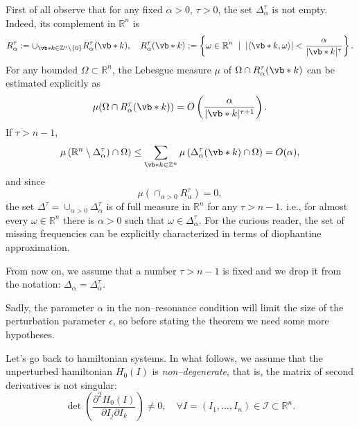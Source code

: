 \documentclass[english,fontsize=11pt,paper=b5]{scrbook}
\numberwithin{equation}{chapter}
\theoremstyle{definition}
\begin{document}
      First of all observe that for any fixed $\alpha>0$, $\tau>0$, the set $\Delta_\alpha^\tau$ is not empty. Indeed, its complement in $\mathbb{R}^n$ is
      \begin{equation}
        R_{\alpha}^\tau := \cup_{\vb* k \in \mathbb{Z}^n\setminus\{0\}} R_{\alpha}^\tau(\vb* k),\quad
        R_{\alpha}^\tau(\vb* k) := \left\{ \omega \in\mathbb{R}^n \;\mid\; |\langle\vb* k, \omega\rangle| < \frac{\alpha}{|\vb* k|^\tau} \right\}.
      \end{equation}
      For any bounded $\Omega\subset\mathbb{R}^n$, the Lebesgue measure $\mu$ of $\Omega\cap R_{\alpha}^\tau(\vb* k)$ can be estimated explicitly as
      \begin{equation}
        \mu(\Omega\cap R_{\alpha}^\tau(\vb* k)) = O\left(\frac{\alpha}{|\vb* k|^{\tau+1}}\right).
      \end{equation}
      If $\tau > n-1$,
      \begin{equation}
        \mu\left(\mathbb{R}^n\setminus\Delta_\alpha^\tau)\cap\Omega\right)\leq
        \sum_{\vb* k\in\mathbb{Z}^n} \mu\left(\Delta_{\alpha}^\tau(\vb* k)\cap\Omega\right) = O(\alpha),
      \end{equation}
      and since
      \begin{equation}
        \mu\left(\cap_{\alpha>0}R_{\alpha}^\tau\right)=0,
      \end{equation}
      the set $\Delta^\tau = \cup_{\alpha>0}\Delta_\alpha^\tau$ is of full measure in $\mathbb{R}^n$ for any $\tau > n-1$. i.e., for almost every $\omega\in\mathbb{R}^n$ there is $\alpha>0$ such that $\omega \in \Delta^\tau_\alpha$.
      For the curious reader, the set of missing frequencies can be explicitly characterized in terms of diophantine approximation.

      From now on, we assume that a number $\tau > n-1$ is fixed and we drop it from the notation: $\Delta_\alpha = \Delta_\alpha^\tau$.

      Sadly, the parameter $\alpha$ in the non--resonance condition will limit the size of the perturbation parameter $\epsilon$, so before stating the theorem we need some more hypotheses.

      Let's go back to hamiltonian systems.
      In what follows, we assume that the unperturbed hamiltonian $H_0(I)$ is \emph{non--degenerate}, that is, the matrix of second derivatives is not singular:
      \begin{equation}\label{eq:Hnondeg}
        \det\left(\frac{\partial^2 H_0(I)}{\partial I_j \partial I_k}\right) \neq 0, \quad \forall I = (I_1, \ldots, I_n)\in\mathcal{I}\subset\mathbb{R}^n.
      \end{equation}
\end{document}
